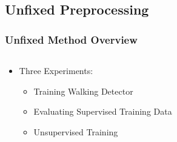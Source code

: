 \documentclass{beamer}
\begin{document}
\subsection{Unfixed Preprocessing}
\begin{frame}
  \frametitle{Unfixed Method Overview}
  \begin{columns}
  \begin{column}{1\textwidth}
  \begin{itemize}
  
  	\item Three Experiments:
 	\begin{itemize}
 		\item Training Walking Detector
 		\linebreak
 		\item Evaluating Supervised Training Data
 		\linebreak
 		\item Unsupervised Training
 	\end{itemize}
 	
  \end{itemize}
  \end{column}
  \begin{column}{0.7\textwidth}
       
  \end{column}
  \end{columns}
\end{frame}
\end{document}

